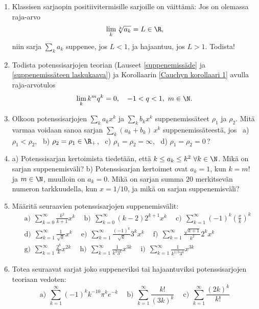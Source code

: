 \begin{enumerate}
\item {}
Klassisen sarjaopin  positiivitermisille sarjoille on väittämä: Jos on
olemassa raja-arvo
\[
\lim_k \sqrt[k]{a_k} = L\in\R,
\]
niin sarja $\sum_k a_k$ suppenee, jos $L<1$, ja hajaantuu, jos $L>1$. Todista!

\item \label{H-I-12: raja-arvotulos}
Todista potenssisarjojen teorian (Lauseet \ref{suppenemissäde} ja 
\ref{suppenemissäteen laskukaava}) ja Korollaarin \ref{Cauchyn korollaari 1} avulla
raja-arvotulos
\[
\lim_k k^m q^k = 0, \quad -1 < q < 1,\ m\in\N.
\]

\item
Olkoon potenssisarjojen $\sum_k a_k x^k$ ja $\sum_k b_k x^k$ suppenemissäteet $\rho_1$ ja
$\rho_2$. Mitä varmaa voidaan sanoa sarjan $\sum_k(a_k+b_k)\,x^k$ suppenemissäteestä, jos \ 
a) $\rho_1<\rho_2$, \ b) $\rho_2=\rho_1\in\R_+$, \ c) $\rho_1=\rho_2=\infty$, \
d) $\rho_1=\rho_2=0$\,?

\item
a) Potenssisarjan kertoimista tiedetään, että $k \le a_k \le k^2\ \forall k\in\N$. Mikä on
sarjan suppenemisväli? \newline
b) Potenssisarjan kertoimet ovat $a_k=1$, kun $k=m!\,$ ja $m\in\N$, muulloin on $a_k=0$. Mikä
on sarjan summa $20$ merkitsevän numeron tarkkuudella, kun $x=1/10$, ja mikä on sarjan
suppenemisväli? 

\item
Määritä seuraavien potenssisarjojen suppenemisvälit:
\begin{align*}
&\text{a)}\ \  \sum_{k=0}^\infty \frac{k^2}{k+1}x^k \quad\
 \text{b)}\ \ \sum_{k=0}^\infty (k-2)2^{k+1}x^k \quad\
 \text{c)}\ \  \sum_{k=1}^\infty (-1)^k (\frac{x}{k})^k \\
&\text{d)}\ \ \sum_{k=1}^\infty \frac{1}{\sqrt{k}} x^k \quad\ 
 \text{e)}\ \ \sum_{k=1}^\infty \frac{(-1)^k}{\sqrt{k}} 3^k x^k \quad\
 \text{f)} \ \ \sum_{k=1}^\infty \frac{\sqrt{k+1}}{k^2} 2^k x^k \\
&\text{g)}\ \ \sum_{k=1}^\infty \frac{2^k}{k} x^{2k} \quad\ 
 \text{h)}\ \ \sum_{k=1}^\infty \frac{1}{k^3 3^k} x^{3k} \quad \
 \text{i)}\ \ \sum_{k=1}^\infty \frac{1}{k^{1/3} 3^k} x^{3k}
\end{align*}

\item
Totea seuraavat sarjat joko suppeneviksi tai hajaantuviksi potenssisarjojen teoriaan vedoten:
\[
\text{a)}\,\ \sum_{k=1}^\infty (-1)^k k^{-10} \pi^k e^{-k} \quad\ 
\text{b)}\,\ \sum_{k=1}^\infty \frac{k!}{(3k)^k} \quad\
\text{c)}\,\ \sum_{k=1}^\infty \frac{(2k)^k}{k!}
\]


\end{enumerate}
